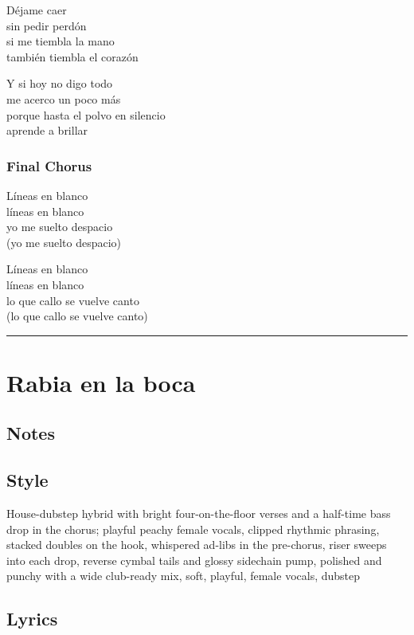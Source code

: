 \documentclass[]{article}
\begin{document}
Déjame caer\\
sin pedir perdón\\
si me tiembla la mano\\
también tiembla el corazón

Y si hoy no digo todo\\
me acerco un poco más\\
porque hasta el polvo en silencio\\
aprende a brillar

\subsubsection{Final Chorus}\label{final-chorus-2}

Líneas en blanco\\
líneas en blanco\\
yo me suelto despacio\\
(yo me suelto despacio)

Líneas en blanco\\
líneas en blanco\\
lo que callo se vuelve canto\\
(lo que callo se vuelve canto)

\begin{center}\rule{0.5\linewidth}{0.5pt}\end{center}

\section{Rabia en la boca}\label{rabia-en-la-boca}

\subsection{Notes}\label{notes-25}

\subsection{Style}\label{style-25}

House-dubstep hybrid with bright four-on-the-floor verses and a
half-time bass drop in the chorus; playful peachy female vocals, clipped
rhythmic phrasing, stacked doubles on the hook, whispered ad-libs in the
pre-chorus, riser sweeps into each drop, reverse cymbal tails and glossy
sidechain pump, polished and punchy with a wide club-ready mix, soft,
playful, female vocals, dubstep

\subsection{Lyrics}\label{lyrics-25}
\end{document}
